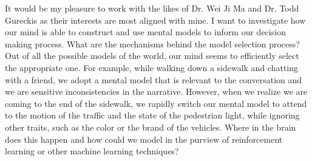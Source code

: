 \documentclass[12pt]{article}
\begin{document}
	It would be my pleasure to work with the likes of Dr. Wei Ji Ma and Dr. Todd Gureckis as their interests are most aligned with mine. I want to investigate how our mind is able to construct and use mental models to inform our decision making process. What are the mechanisms behind the model selection process? Out of all the possible models of the world, our mind seems to efficiently select the appropriate one. For example, while walking down a sidewalk and chatting with a friend, we adopt a mental model that is relevant to the conversation and we are sensitive inconsistencies in the narrative. However, when we realize we are coming to the end of the sidewalk, we rapidly switch our mental model to attend to the motion of the traffic and the state of the pedestrian light, while ignoring other traits, such as the color or the brand of the vehicles. Where in the brain does this happen and how could we model in the purview of reinforcement learning or other machine learning techniques?
	
\end{document}
